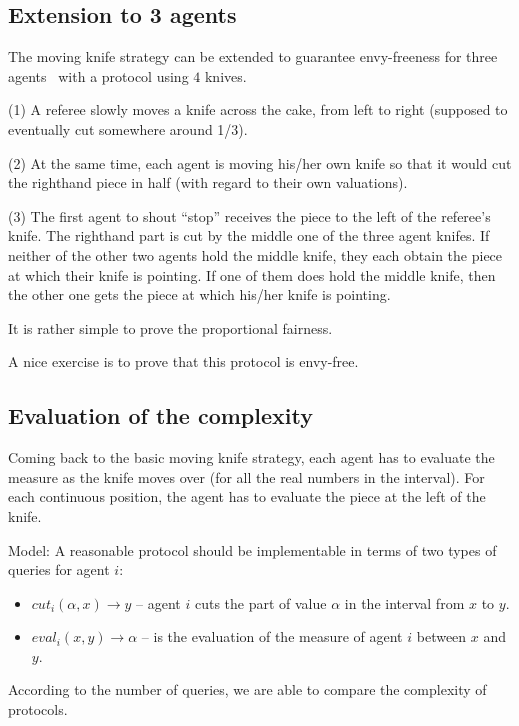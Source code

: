 \subsection{Extension to 3 agents}

The moving knife strategy can be extended to guarantee envy-freeness for three agents~\cite{Stromquist}
with a protocol using $4$ knives.

(1) A referee slowly moves a knife across the cake, from left to right
(supposed to eventually cut somewhere around 1/3).

(2) At the same time, each agent is moving his/her own knife so that it would cut the righthand piece in half 
(with regard to their own valuations).

(3) The first agent to shout “stop” receives the piece to the left of the referee’s knife. 
The righthand part is cut by the middle one of the three agent knifes. 
If neither of the other two agents hold the middle knife, they each obtain the piece at which their knife is pointing. 
If one of them does hold the middle knife, then the other one gets the piece at which his/her knife is pointing.
\bigskip

It is rather simple to prove the proportional fairness.
\bigskip

A nice exercise is to prove that this protocol is envy-free. 


\subsection{Evaluation of the complexity}

Coming back to the basic moving knife strategy, each agent has to evaluate the measure as the knife moves over (for all the real numbers in the interval). 
For each continuous position, the agent has to evaluate the piece at the left of the knife.

Model:
 A reasonable protocol should be implementable in terms of two types of queries for agent $i$:
 
 \begin{itemize}
 \item $cut_i(\alpha,x) \rightarrow y$ -- agent $i$ cuts the part of value $\alpha$ in the interval from $x$ to $y$. 
 \item $eval_i(x,y) \rightarrow \alpha$ -- is the evaluation of the measure of agent $i$  between $x$ and $y$.
 \end{itemize}
 
 According to the number of queries, we are able to compare the complexity of protocols.


